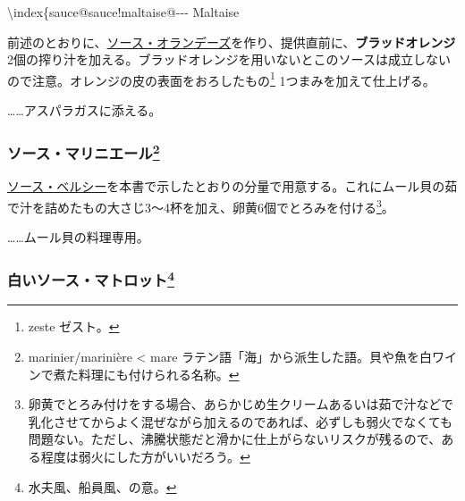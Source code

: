\begin{recette}
\textbackslash{}index\{sauce@sauce!maltaise@-\/-\/- Maltaise
 

前述のとおりに、\protect\hyperlink{sauce-hollandaise}{ソース・オランデーズ}を作り、提供直前に、\textbf{ブラッドオレンジ}2個の搾り汁を加える。ブラッドオレンジを用いないとこのソースは成立しないので注意。オレンジの皮の表面をおろしたもの\footnote{zeste
  ゼスト。} 1つまみを加えて仕上げる。

\ldots{}\ldots{}アスパラガスに添える。

\atoaki{}

\hypertarget{sauce-mariniere}{%
\subsubsection[ソース・マリニエール]{\texorpdfstring{ソース・マリニエール\footnote{marinier/marinière
  \textless{} mare
  ラテン語「海」から派生した語。貝や魚を白ワインで煮た料理にも付けられる名称。}}{ソース・マリニエール}}\label{sauce-mariniere}}


 

\protect\hyperlink{sauce-bercy}{ソース・ベルシー}を本書で示したとおりの分量で用意する。これにムール貝の茹で汁を詰めたもの大さじ3〜4杯を加え、卵黄6個でとろみを付ける\footnote{卵黄でとろみ付けをする場合、あらかじめ生クリームあるいは茹で汁などで乳化させてからよく混ぜながら加えるのであれば、必ずしも弱火でなくても問題ない。ただし、沸騰状態だと滑かに仕上がらないリスクが残るので、ある程度は弱火にした方がいいだろう。}。

\ldots{}\ldots{}ムール貝の料理専用。

\atoaki{}

\hypertarget{sauce-matelote-blanche}{%
\subsubsection[白いソース・マトロット]{\texorpdfstring{白いソース・マトロット\footnote{水夫風、船員風、の意。}}{白いソース・マトロット}}\label{sauce-matelote-blanche}}


\end{recette}
